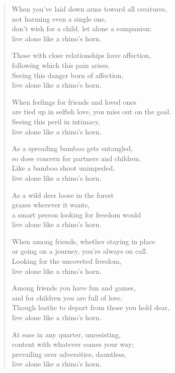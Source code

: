 \documentclass[12pt,openany]{book}%
\begin{document}
\begin{verse}%
When you’ve laid down arms toward all creatures, \\
not harming even a single one, \\
don’t wish for a child, let alone a companion: \\
live alone like a rhino’s horn. 

Those with close relationships have affection, \\
following which this pain arises. \\
Seeing this danger born of affection, \\
live alone like a rhino’s horn. 

When feelings for friends and loved ones \\
are tied up in selfish love, you miss out on the goal. \\
Seeing this peril in intimacy, \\
live alone like a rhino’s horn. 

As a spreading bamboo gets entangled, \\
so does concern for partners and children. \\
Like a bamboo shoot unimpeded, \\
live alone like a rhino’s horn. 

As a wild deer loose in the forest \\
grazes wherever it wants, \\
a smart person looking for freedom would \\
live alone like a rhino’s horn. 

When among friends, whether staying in place \\
or going on a journey, you’re always on call. \\
Looking for the uncoveted freedom, \\
live alone like a rhino’s horn. 

Among friends you have fun and games, \\
and for children you are full of love. \\
Though loathe to depart from those you hold dear, \\
live alone like a rhino’s horn. 

At ease in any quarter, unresisting, \\
content with whatever comes your way; \\
prevailing over adversities, dauntless, \\
live alone like a rhino’s horn. 


\end{verse}
\end{document}
